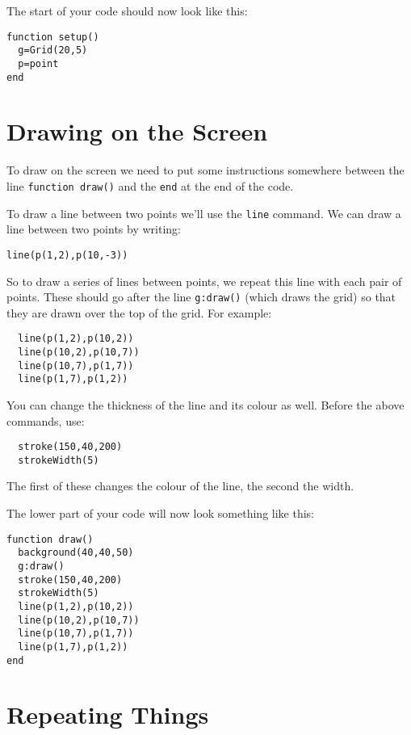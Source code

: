 \documentclass[
  xhtml,%
  use filename%
]{internet}
\begin{document}
The start of your code should now look like this:

\begin{verbatim}
function setup()
  g=Grid(20,5)
  p=point
end
\end{verbatim}

\section{Drawing on the Screen}

To draw on the screen we need to put some instructions somewhere between the line \verb+function draw()+ and the \verb+end+ at the end of the code.

To draw a line between two points we'll use the \verb+line+ command.
We can draw a line between two points by writing:

\begin{verbatim}
line(p(1,2),p(10,-3))
\end{verbatim}

So to draw a series of lines between points, we repeat this line with each pair of points.
These should go after the line \verb+g:draw()+ (which draws the grid) so that they are drawn over the top of the grid.
For example:

\begin{verbatim}
  line(p(1,2),p(10,2))
  line(p(10,2),p(10,7))
  line(p(10,7),p(1,7))
  line(p(1,7),p(1,2))
\end{verbatim}

You can change the thickness of the line and its colour as well.
Before the above commands, use:

\begin{verbatim}
  stroke(150,40,200)
  strokeWidth(5)
\end{verbatim}

The first of these changes the colour of the line, the second the width.

The lower part of your code will now look something like this:

\begin{verbatim}
function draw()
  background(40,40,50)
  g:draw()
  stroke(150,40,200)
  strokeWidth(5)
  line(p(1,2),p(10,2))
  line(p(10,2),p(10,7))
  line(p(10,7),p(1,7))
  line(p(1,7),p(1,2))
end
\end{verbatim}

\section{Repeating Things}
\end{document}
